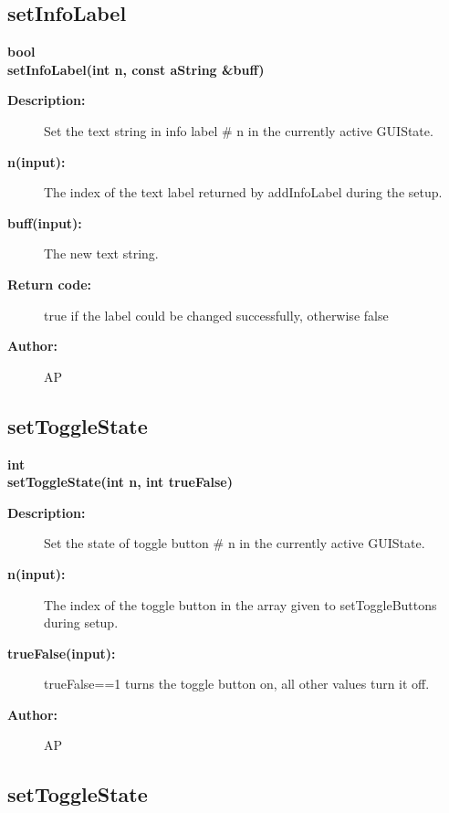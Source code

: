 \subsection{setInfoLabel}
 
\begin{flushleft} \textbf{%
bool  \\ 
\settowidth{\DialogDataIncludeArgIndent}{setInfoLabel(}%
setInfoLabel(int n, const aString \&buff)
}\end{flushleft}
\begin{description}
\item[{\bf Description:}]  Set the text string in info label \# n in the currently
 active GUIState.

\item[{\bf n(input):}]  The index of the text label returned by addInfoLabel during the setup.
\item[{\bf buff(input):}]  The new text string.

\item[{\bf Return code:}]  true if the label could be changed successfully, otherwise false

\item[{\bf Author:}]  AP
\end{description}
\subsection{setToggleState}
 
\begin{flushleft} \textbf{%
int  \\ 
\settowidth{\DialogDataIncludeArgIndent}{setToggleState(}%
setToggleState(int n, int trueFalse)
}\end{flushleft}
\begin{description}
\item[{\bf Description:}]  Set the state of toggle button \# n in the currently
 active GUIState.

\item[{\bf n(input):}]  The index of the toggle button in the array given to setToggleButtons during setup.
\item[{\bf trueFalse(input):}]  trueFalse==1 turns the toggle button on, all other values turn it off.

\item[{\bf Author:}]  AP
\end{description}
\subsection{setToggleState}
 
